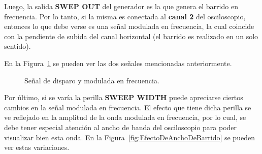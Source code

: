     Luego, la salida \textbf{SWEP OUT} del generador es la que genera el barrido en frecuencia. Por lo tanto, si la misma
    es conectada al \textbf{canal 2} del osciloscopio, entonces lo que debe verse es una señal modulada en frecuencia, la cual
    coincide con la pendiente de subida del canal horizontal (el barrido es realizado en un solo sentido). 

    En la Figura~\ref{fig:SeñalDisparoySeñalFM} se pueden ver las dos señales mencionadas anteriormente.

    \begin{figure}[H]
      \centering
      \caption{Señal de disparo y modulada en frecuencia.}
      \label{fig:SeñalDisparoySeñalFM}
    \end{figure}

    Por último, si se varía la perilla \textbf{SWEEP WIDTH} puede apreciarse ciertos cambios en la señal modulada en frecuencia.
    El efecto que tiene dicha perilla se ve reflejado en la amplitud de la onda modulada en frecuencia, por lo cual, se debe
    tener especial atención al ancho de banda del osciloscopio para poder visualizar bien esta onda. En la 
    Figura~\ref{fig:EfectoDeAnchoDeBarrido} se pueden ver estas variaciones.


